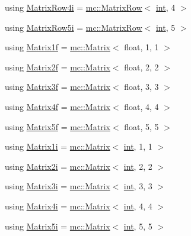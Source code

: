 \begin{DoxyCompactItemize}
\item 
using \hyperlink{namespacemc_ae0265bef81dbac954f173a2408c9ce60}{Matrix\+Row4i} = \hyperlink{namespacemc_a864ada9f6799e62e26d4b02bbd1ac4c2}{mc\+::\+Matrix\+Row}$<$ \hyperlink{_s_d_l__thread_8h_a6a64f9be4433e4de6e2f2f548cf3c08e}{int}, 4 $>$
\item 
using \hyperlink{namespacemc_a458456087c23e1a0463a13c566050b0b}{Matrix\+Row5i} = \hyperlink{namespacemc_a864ada9f6799e62e26d4b02bbd1ac4c2}{mc\+::\+Matrix\+Row}$<$ \hyperlink{_s_d_l__thread_8h_a6a64f9be4433e4de6e2f2f548cf3c08e}{int}, 5 $>$
\item 
using \hyperlink{namespacemc_a6b3e43f58be598160b2a72a45f8da74a}{Matrix1f} = \hyperlink{structmc_1_1_matrix}{mc\+::\+Matrix}$<$ float, 1, 1 $>$
\item 
using \hyperlink{namespacemc_a7f5fd82341ebac4add0554139e58ec61}{Matrix2f} = \hyperlink{structmc_1_1_matrix}{mc\+::\+Matrix}$<$ float, 2, 2 $>$
\item 
using \hyperlink{namespacemc_a142a9fb1b5ed3503c520caca5924389e}{Matrix3f} = \hyperlink{structmc_1_1_matrix}{mc\+::\+Matrix}$<$ float, 3, 3 $>$
\item 
using \hyperlink{namespacemc_afd32b9ea49ccd962bb337dc71450595b}{Matrix4f} = \hyperlink{structmc_1_1_matrix}{mc\+::\+Matrix}$<$ float, 4, 4 $>$
\item 
using \hyperlink{namespacemc_ab12faae3cb1ef53b80a57c8586134343}{Matrix5f} = \hyperlink{structmc_1_1_matrix}{mc\+::\+Matrix}$<$ float, 5, 5 $>$
\item 
using \hyperlink{namespacemc_abd3b65ef804598d2bcb93051d7fbcc9e}{Matrix1i} = \hyperlink{structmc_1_1_matrix}{mc\+::\+Matrix}$<$ \hyperlink{_s_d_l__thread_8h_a6a64f9be4433e4de6e2f2f548cf3c08e}{int}, 1, 1 $>$
\item 
using \hyperlink{namespacemc_a3d6ef8ef71b722b552a14b3859cca75f}{Matrix2i} = \hyperlink{structmc_1_1_matrix}{mc\+::\+Matrix}$<$ \hyperlink{_s_d_l__thread_8h_a6a64f9be4433e4de6e2f2f548cf3c08e}{int}, 2, 2 $>$
\item 
using \hyperlink{namespacemc_af5dbdaac2f76c49ea96bafaf8743298e}{Matrix3i} = \hyperlink{structmc_1_1_matrix}{mc\+::\+Matrix}$<$ \hyperlink{_s_d_l__thread_8h_a6a64f9be4433e4de6e2f2f548cf3c08e}{int}, 3, 3 $>$
\item 
using \hyperlink{namespacemc_a2b5b12e5123fac956ab87c789991537e}{Matrix4i} = \hyperlink{structmc_1_1_matrix}{mc\+::\+Matrix}$<$ \hyperlink{_s_d_l__thread_8h_a6a64f9be4433e4de6e2f2f548cf3c08e}{int}, 4, 4 $>$
\item 
using \hyperlink{namespacemc_ae1c885363bd63ce278b21e95350ca637}{Matrix5i} = \hyperlink{structmc_1_1_matrix}{mc\+::\+Matrix}$<$ \hyperlink{_s_d_l__thread_8h_a6a64f9be4433e4de6e2f2f548cf3c08e}{int}, 5, 5 $>$
\end{DoxyCompactItemize}
